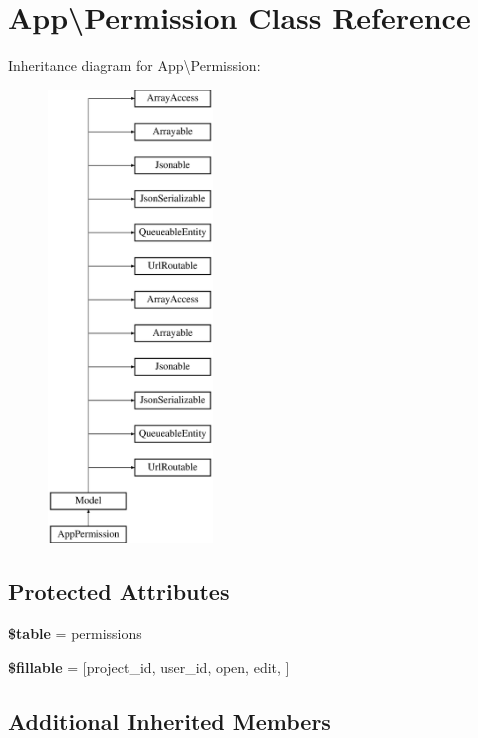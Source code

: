 \section{App\textbackslash{}Permission Class Reference}
\label{class_app_1_1_permission}
Inheritance diagram for App\textbackslash{}Permission\+:\begin{figure}[H]
\begin{center}
\leavevmode
\includegraphics[height=12.000000cm]{class_app_1_1_permission}
\end{center}
\end{figure}
\subsection*{Protected Attributes}
\begin{DoxyCompactItemize}
\item 
{\bf \$table} = \textquotesingle{}permissions\textquotesingle{}
\item 
{\bf \$fillable} = [\textquotesingle{}project\+\_\+id\textquotesingle{}, \textquotesingle{}user\+\_\+id\textquotesingle{}, \textquotesingle{}open\textquotesingle{}, \textquotesingle{}edit\textquotesingle{}, \textquotesingle{}]
\end{DoxyCompactItemize}
\subsection*{Additional Inherited Members}


